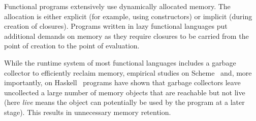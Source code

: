 \documentclass[9pt]{sigplanconf}
\begin{document}
Functional programs extensively use dynamically allocated memory.  The
allocation  is either  explicit (for  example, using  constructors) or
implicit  (during creation  of  closures).  Programs  written in  lazy
functional languages put additional  demands on memory as they require
closures to  be carried  from the  point of creation  to the  point of
evaluation.

While  the runtime  system  of most  functional  languages includes  a
garbage collector to efficiently  reclaim memory, empirical studies on
Scheme~\cite{karkare06effectiveness}   and,   more   importantly,   on
Haskell~\cite{rojemo96lag}
programs have shown that  garbage collectors leave uncollected a large
number of  memory objects that are  reachable but not  live (here {\em
  live} means the  object can potentially be used by  the program at a
later stage).  This results in unnecessary memory retention.

\newcommand{\nilfigure}
{\scalebox{0.75}{
\psset{unit=1mm,nodesep=0mm,labelsep=0.5mm}
\begin{pspicture}(0,0)(1,1)
subgriddiv=5,subgridcolor=gray,gridcolor=blue](0,0)(1,1)
\putnode{start}{origin}{0}{0}{}
\putnode{stop}{origin}{10}{10}{}
\ncline[offsetB=0,nodesepB=0,linewidth=.7]{-}{start}{stop} %
\end{pspicture}
}}
\end{document}

